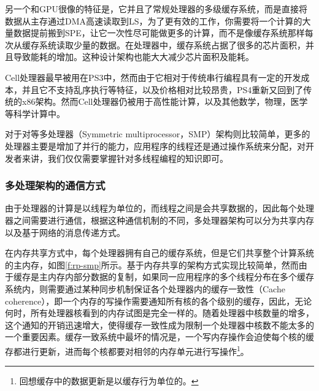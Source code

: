 另一个和GPU很像的特征是，它并且了常规处理器的多级缓存系统，而是直接将数据从主存通过DMA高速读取到LS，为了更有效的工作，你需要将一个计算的大量数据提前搬到SPE，让它一次性尽可能做更多的计算，而不是像缓存系统那样每次从缓存系统读取少量的数据。在处理器中，缓存系统占据了很多的芯片面积，并且导致能耗的增加。这种设计架构也能大大减少芯片面积及能耗。

Cell处理器最早被用在PS3中\cite{a:PlayStation3SystemArchitecture}，然而由于它相对于传统串行编程具有一定的开发成本，并且它不支持乱序执行等特征，以及价格相对比较昂贵，PS4重新又回到了传统的x86架构。然而Cell处理器仍被用于高性能计算，以及其他数学，物理，医学等科学计算中。

对于对等多处理器（Symmetric multiprocessor，SMP）架构则比较简单，更多的处理器主要是增加了并行的能力，应用程序的线程还是通过操作系统来分配，对开发者来讲，我们仅仅需要掌握针对多线程编程的知识即可。




\subsubsection{多处理架构的通信方式}
由于处理器的计算是以线程为单位的，而线程之间是会共享数据的，因此每个处理器之间需要进行通信，根据这种通信机制的不同，多处理器架构可以分为共享内存以及基于网络的消息传递方式。

在内存共享方式中，每个处理器拥有自己的缓存系统，但是它们共享整个计算系统的主内存，如图\ref{f:rp-smp}所示。基于内存共享的架构方式实现比较简单，然而由于缓存是主内存内部分数据的复制，如果同一应用程序的多个线程分布在多个缓存系统内，则需要通过某种同步机制保证各个处理器内的缓存一致性（Cache coherence），即一个内存的写操作需要通知所有核的各个级别的缓存，因此，无论何时，所有处理器核看到的内存试图是完全一样的。随着处理器中核数量的增多，这个通知的开销迅速增大，使得缓存一致性成为限制一个处理器中核数不能太多的一个重要因素。缓存一致系统中最坏的情况是，一个写内存操作会迫使每个核的缓存都进行更新，进而每个核都要对相邻的内存单元进行写操作\footnote{回想缓存中的数据更新是以缓存行为单位的。}。

